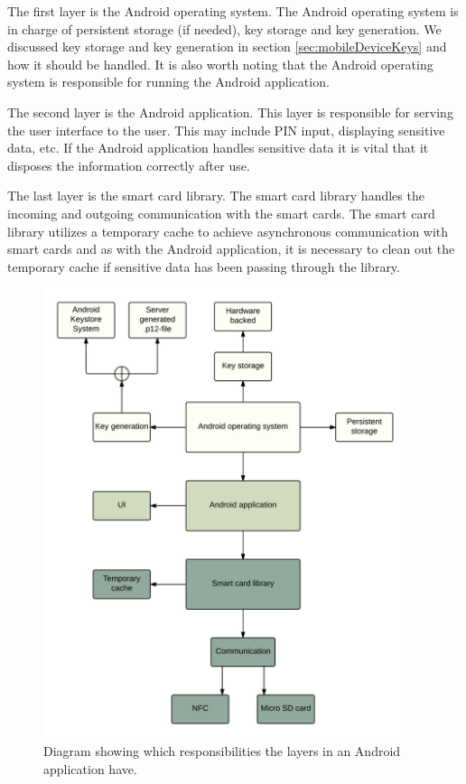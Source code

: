 The first layer is the Android operating system. The Android operating system is in charge of persistent storage (if needed), key storage and key generation. We discussed key storage and key generation in section \ref{sec:mobileDeviceKeys} and how it should be handled. It is also worth noting that the Android operating system is responsible for running the Android application.

The second layer is the Android application. This layer is responsible for serving the user interface to the user. This may include PIN input, displaying sensitive data, etc. If the Android application handles sensitive data it is vital that it disposes the information correctly after use.

The last layer is the smart card library. The smart card library handles the incoming and outgoing communication with the smart cards. The smart card library utilizes a temporary cache to achieve asynchronous communication with smart cards and as with the Android application, it is necessary to clean out the temporary cache if sensitive data has been passing through the library.

\begin{figure}[h!]
  \captionsetup{justification=centering,margin=1.5cm}
  \caption{Diagram showing which responsibilities the layers in an Android application have.}
  \label{fig:responsibility}
  \centering
    \includegraphics[width=0.95\textwidth]{images/Component_diagram.png}
\end{figure}
\clearpage


